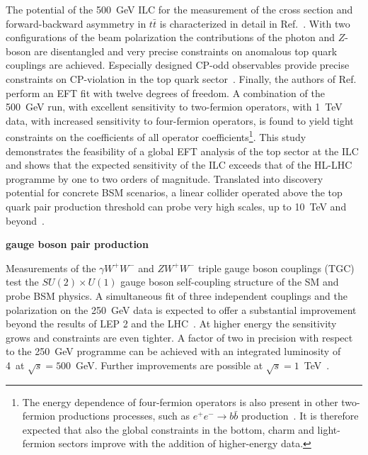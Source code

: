 The potential of the 500~GeV{} ILC for the measurement of the cross section and forward-backward asymmetry in
$t\bar{t}$ is characterized in detail in Ref.~\cite{Amjad:2015mma}. With two configurations of the beam polarization
the contributions of the photon and $Z$-boson are disentangled and very precise constraints on anomalous top quark
couplings are achieved. Especially designed CP-odd observables provide precise constraints on CP-violation in the
top quark sector~\cite{Bernreuther:2017cyi}. Finally, the authors of Ref.~\cite{Durieux:2018tev} perform an EFT fit
with twelve degrees of freedom. A combination of the 500~GeV run, with excellent sensitivity to two-fermion operators,
with 1~TeV{} data, with increased sensitivity to four-fermion operators, is found to yield tight constraints on the
coefficients of all operator coefficients\footnote{The energy dependence of four-fermion operators is also present in
other two-fermion productions processes, such as $e^+e^- \rightarrow b\bar{b}$ production~\cite{Bilokin:2017lco}. It is
therefore expected that also the global constraints in the bottom, charm and light-fermion sectors improve with the addition
of higher-energy data.}. This study demonstrates the feasibility of a global EFT analysis of the top sector
at the ILC and shows that the expected sensitivity of the ILC exceeds that of the HL-LHC programme by one to two orders of
magnitude. Translated into discovery potential for concrete BSM scenarios, a linear collider operated above the top quark
pair production threshold can probe very high scales, up to 10~TeV and beyond~\cite{Durieux:2018ekg}. 

{\bf gauge boson pair production}


Measurements of the $\gamma W^+W^-$ and $ZW^+W^-$ triple gauge boson couplings (TGC) test the $SU(2) \times U(1)$
gauge boson self-coupling structure of the SM and probe BSM physics. A simultaneous fit of three independent couplings and
the polarization on the 250~GeV{} data is expected to offer a substantial improvement beyond the results of LEP 2 and the
LHC~\cite{Fujii:2017vwa}. At higher energy the sensitivity grows and constraints are even tighter. A factor of two in
precision\cite{Marchesini:2011aka} with respect to the 250~GeV{} programme can be achieved with an integrated
luminosity of 4~\iab at $\sqrt{s}=500$~GeV. Further improvements are possible at   $\sqrt{s}=1$~TeV~\cite{Rosca:2016hcq}.



